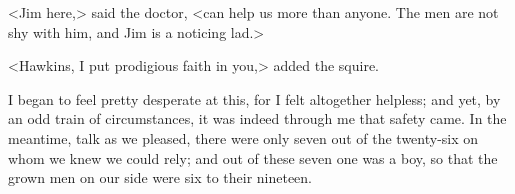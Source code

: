 <Jim here,> said the doctor, <can help us more than anyone. The men are not shy with him, and Jim is a noticing lad.>

<Hawkins, I put prodigious faith in you,> added the squire.

I began to feel pretty desperate at this, for I felt altogether helpless; and yet, by an odd train of circumstances, it was indeed through me that safety came. In the meantime, talk as we pleased, there were only seven out of the twenty-six on whom we knew we could rely; and out of these seven one was a boy, so that the grown men on our side were six to their nineteen.
